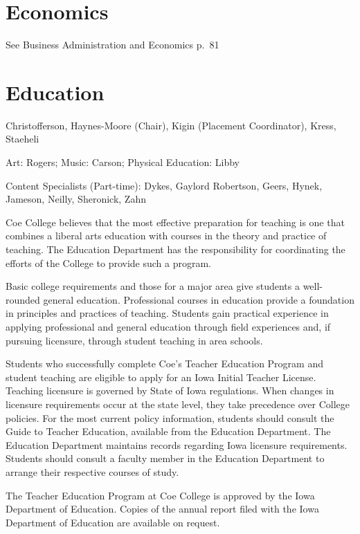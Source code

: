 \documentclass[
  letterpaper,
]{scrbook}
\begin{document}
\section{Economics}\label{economics-1}

See Business Administration and Economics p.~81

\section{Education}\label{education}

Christofferson, Haynes-Moore (Chair), Kigin (Placement Coordinator),
Kress, Staeheli

Art: Rogers; Music: Carson; Physical Education: Libby

Content Specialists (Part-time): Dykes, Gaylord Robertson, Geers, Hynek,
Jameson, Neilly, Sheronick, Zahn

Coe College believes that the most effective preparation for teaching is
one that combines a liberal arts education with courses in the theory
and practice of teaching. The Education Department has the
responsibility for coordinating the efforts of the College to provide
such a program.

Basic college requirements and those for a major area give students a
well-rounded general education. Professional courses in education
provide a foundation in principles and practices of teaching. Students
gain practical experience in applying professional and general education
through field experiences and, if pursuing licensure, through student
teaching in area schools.

Students who successfully complete Coe's Teacher Education Program and
student teaching are eligible to apply for an Iowa Initial Teacher
License. Teaching licensure is governed by State of Iowa regulations.
When changes in licensure requirements occur at the state level, they
take precedence over College policies. For the most current policy
information, students should consult the Guide to Teacher Education,
available from the Education Department. The Education Department
maintains records regarding Iowa licensure requirements. Students should
consult a faculty member in the Education Department to arrange their
respective courses of study.

The Teacher Education Program at Coe College is approved by the Iowa
Department of Education. Copies of the annual report filed with the Iowa
Department of Education are available on request.
\end{document}
